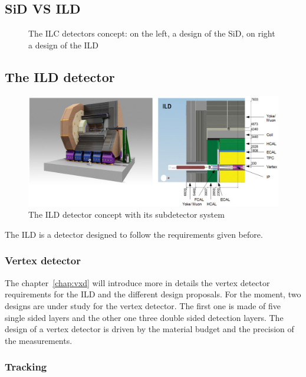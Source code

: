       \subsection{SiD VS ILD}
    \begin{figure}
      \centering
      \caption{The ILC detectors concept: on the left, a design of the SiD, on right a design of the ILD }
      \label{fig:SiLD}
    \end{figure}    
    
    \subsection{The ILD detector}
    
    \begin{figure}
      \centering
      \includegraphics[width = 20cm]{Pictures/ild-detector-ilc.jpg}
      \caption{The ILD detector concept with its subdetector system}
      \label{fig:ILD}
    \end{figure}

    The \gls{ILD} is a detector designed to follow the requirements given before.
    

      \subsubsection{Vertex detector}

      The chapter~\ref{chap:vxd} will introduce more in details the vertex detector requirements for the \gls{ILD} and the different design proposals. 
      For the moment, two designs are under study for the vertex detector.
      The first one is made of five single sided layers and the other one three double sided detection layers.
      The design of a vertex detector is driven by the material budget and the precision of the measurements.

      \subsubsection{Tracking}


